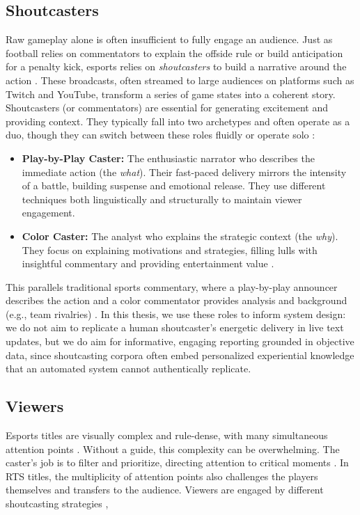 \subsection{Shoutcasters}
Raw gameplay alone is often insufficient to fully engage an audience. Just as football relies on commentators to explain the offside rule or build anticipation for a penalty kick, esports relies on \textit{shoutcasters} to build a narrative around the action \cite{kempecook2019}. These broadcasts, often streamed to large audiences on platforms such as Twitch and YouTube, transform a series of game states into a coherent story.
Shoutcasters (or commentators) are essential for generating excitement and providing context. They typically fall into two archetypes and often operate as a duo, though they can switch between these roles fluidly \cite{li2020} or operate solo \cite{kempecook2019}:
\begin{itemize}
  \item \textbf{Play-by-Play Caster:} The enthusiastic narrator who describes the immediate action (the \textit{what}). Their fast-paced delivery mirrors the intensity of a battle, building suspense and emotional release. They use different techniques both linguistically \cite{byro2017,gustin2020} and structurally \cite{penney2021, cheung2011starcraft} to maintain viewer engagement.
  \item \textbf{Color Caster:} The analyst who explains the strategic context (the \textit{why}). They focus on explaining motivations and strategies, filling lulls with insightful commentary and providing entertainment value \cite{li2020}.
\end{itemize}
This parallels traditional sports commentary, where a play-by-play announcer describes the action and a color commentator provides analysis and background (e.g., team rivalries) \cite{bryant1982}. In this thesis, we use these roles to inform system design: we do not aim to replicate a human shoutcaster's energetic delivery in live text updates, but we do aim for informative, engaging reporting grounded in objective data, since shoutcasting corpora often embed personalized experiential knowledge that an automated system cannot authentically replicate.

\subsection{Viewers}
Esports titles are visually complex and rule-dense, with many simultaneous attention points \cite{lux2019}. Without a guide, this complexity can be overwhelming. The caster's job is to filter and prioritize, directing attention to critical moments \cite{kempecook2019}. In RTS titles, the multiplicity of attention points also challenges the players themselves and transfers to the audience. Viewers are engaged by different shoutcasting strategies \cite{cheung2011starcraft,block2018},

